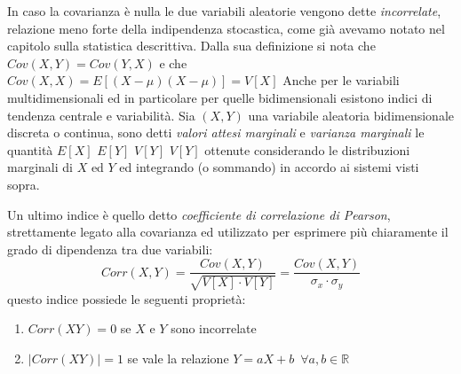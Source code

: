 \documentclass[a4paper,12pt, oneside]{book}
\newcommand{\numberset}{\mathbb}
\newcommand{\R}{\numberset{R}}
\begin{document}
In caso la covarianza è nulla le due variabili aleatorie vengono dette \emph{incorrelate}, relazione meno 
forte della indipendenza stocastica, come già avevamo notato nel capitolo sulla statistica descrittiva.\newline
Dalla sua definizione si nota che $Cov(X, Y) = Cov(Y, X)$ e che $Cov(X, X) = E[(X - \mu)(X - \mu)] = V[X]$
Anche per le variabili multidimensionali ed in particolare per quelle bidimensionali 
esistono indici di tendenza centrale e variabilità.\newline
Sia $(X, Y)$ una variabile aleatoria bidimensionale discreta o continua, sono detti \emph{valori attesi marginali} 
e \emph{varianza marginali }le quantità $E[X]\,\,E[Y]\,\,V[Y]\,\,V[Y]$
ottenute considerando le distribuzioni marginali di $X$ ed $Y $ ed integrando (o sommando) in accordo ai sistemi visti sopra.

Un ultimo indice è quello detto \emph{coefficiente di correlazione di Pearson}, strettamente legato 
alla covarianza ed utilizzato per esprimere più chiaramente il grado di dipendenza tra due variabili:
\[Corr(X, Y) = \frac{Cov(X,Y)}{\sqrt{V[X]\cdot V[Y]}} = \frac{Cov(X,Y)}{\sigma_x\cdot \sigma_y}\]
questo indice possiede le seguenti proprietà:
\begin{enumerate}
    \item $Corr(XY) = 0$ se $X$ e $Y$ sono incorrelate
    \item $|Corr(XY)| = 1$ se vale la relazione $Y= aX + b\,\,\,\forall a,b \in \R$
\end{enumerate}
\end{document}
